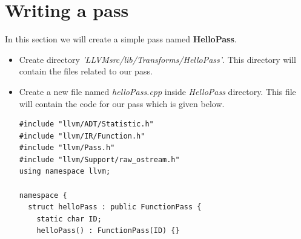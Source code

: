\section{Writing a pass}
\label{WritingAPass}
In this section we will create a simple pass named \textbf{HelloPass}.
\begin{itemize}
    \item Create directory \textit{'LLVMsrc/lib/Transforms/HelloPass'}. This directory will contain the files related to our pass.
    \item Create a new file named \textit{helloPass.cpp} inside \textit{HelloPass} directory. This file will contain the code for our pass which is given below.
        \begin{lstlisting}
#include "llvm/ADT/Statistic.h"
#include "llvm/IR/Function.h"
#include "llvm/Pass.h"
#include "llvm/Support/raw_ostream.h"
using namespace llvm;

namespace {
  struct helloPass : public FunctionPass {
    static char ID;
    helloPass() : FunctionPass(ID) {}


\end{lstlisting}
\end{itemize}
